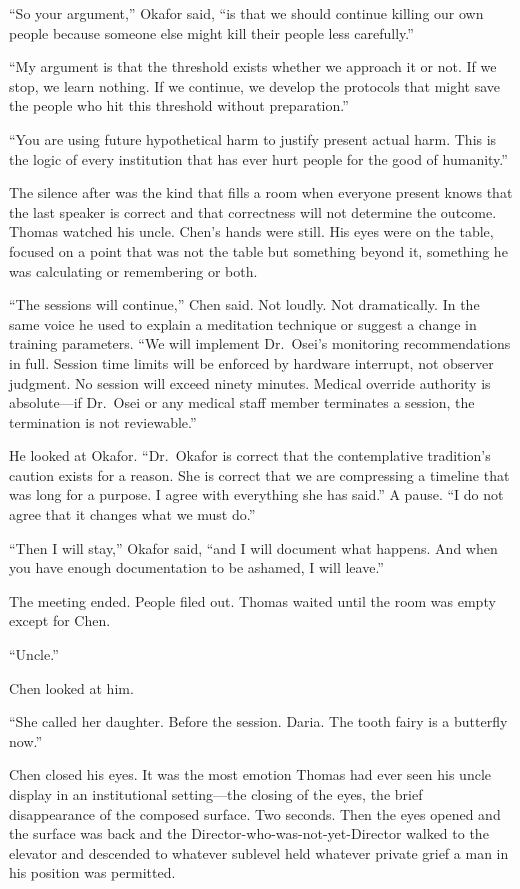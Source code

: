 ``So your argument,'' Okafor said, ``is that we should continue killing our own people because someone else might kill their people less carefully.''

``My argument is that the threshold exists whether we approach it or not. If we stop, we learn nothing. If we continue, we develop the protocols that might save the people who hit this threshold without preparation.''

``You are using future hypothetical harm to justify present actual harm. This is the logic of every institution that has ever hurt people for the good of humanity.''

The silence after was the kind that fills a room when everyone present knows that the last speaker is correct and that correctness will not determine the outcome. Thomas watched his uncle. Chen's hands were still. His eyes were on the table, focused on a point that was not the table but something beyond it, something he was calculating or remembering or both.

``The sessions will continue,'' Chen said. Not loudly. Not dramatically. In the same voice he used to explain a meditation technique or suggest a change in training parameters. ``We will implement Dr.\ Osei's monitoring recommendations in full. Session time limits will be enforced by hardware interrupt, not observer judgment. No session will exceed ninety minutes. Medical override authority is absolute---if Dr.\ Osei or any medical staff member terminates a session, the termination is not reviewable.''

He looked at Okafor. ``Dr.\ Okafor is correct that the contemplative tradition's caution exists for a reason. She is correct that we are compressing a timeline that was long for a purpose. I agree with everything she has said.'' A pause. ``I do not agree that it changes what we must do.''

``Then I will stay,'' Okafor said, ``and I will document what happens. And when you have enough documentation to be ashamed, I will leave.''

The meeting ended. People filed out. Thomas waited until the room was empty except for Chen.

``Uncle.''

Chen looked at him.

``She called her daughter. Before the session. Daria. The tooth fairy is a butterfly now.''

Chen closed his eyes. It was the most emotion Thomas had ever seen his uncle display in an institutional setting---the closing of the eyes, the brief disappearance of the composed surface. Two seconds. Then the eyes opened and the surface was back and the Director-who-was-not-yet-Director walked to the elevator and descended to whatever sublevel held whatever private grief a man in his position was permitted.

